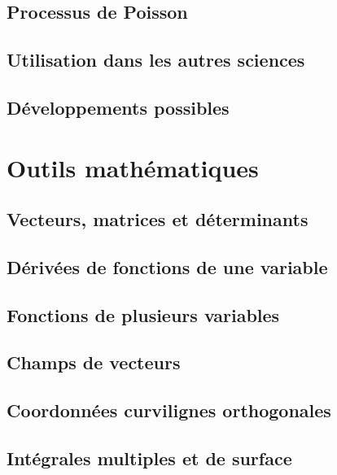 \chapter{Processus de Poisson}


\chapter{Utilisation dans les autres sciences}


\chapter{Développements possibles}



 
\part{Outils mathématiques} 

\chapter{Vecteurs, matrices et déterminants}
    

\chapter{Dérivées de fonctions de une variable}


\chapter{Fonctions de plusieurs variables}


\chapter{Champs de vecteurs}


\chapter{Coordonnées curvilignes orthogonales}


\chapter{Intégrales multiples et de surface}



